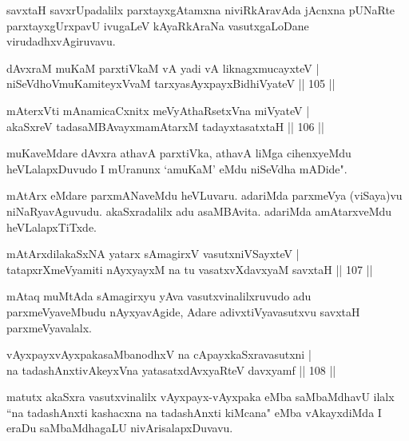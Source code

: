\begin{artha}
savxtaH savxrUpadalilx parxtayxgAtamxna niviRkAravAda jAcnxna pUNaRte parxtayxgUrxpavU ivugaLeV kAyaRkAraNa vasutxgaLoDane virudadhxvAgiruvavu.
\end{artha}

\begin{shl}
dAvxraM muKaM parxtiVkaM vA yadi vA liknagxmucayxteV |\\
niSeVdhoV\s muKamiteyxVvaM tarxyasAyxpayxBidhiVyateV \hfill || 105 ||
\end{shl}

\begin{shl}
mAterxVti mAnamicaCxnitx meVyA\s thaRsetxVna miVyateV |\\
akaSxreV tadasaMBAvayxmamAtarxM tadayxtasatxtaH \hfill || 106 ||
\end{shl}

\begin{artha}
muKaveMdare dAvxra athavA parxtiVka, athavA liMga cihenxyeMdu heVLalapxDuvudo I mUranunx `amuKaM' eMdu niSeVdha mADide".
\end{artha}

\begin{artha}%
mAtArx eMdare parxmANaveMdu heVLuvaru. adariMda parxmeVya (viSaya)vu niNaRyavAguvudu. akaSxradalilx adu asaMBAvita. adariMda amAtarxveMdu heVLalapxTiTxde. 
\end{artha}

\begin{shl}
mAtArxdilakaSxNA yatarx sAmagirxV vasutxniVSayxteV |\\
tatapxrXmeVyamiti nAyxyayxM na tu vasatxvXdavxyaM savxtaH \hfill || 107 ||
\end{shl}

\begin{artha}
mAtaq muMtAda sAmagirxyu yAva vasutxvinalilxruvudo adu parxmeVya\-veMbudu nAyxyavAgide, Adare adivxtiVyavasutxvu savxtaH parxmeVyavalalx.
\end{artha}

\begin{shl}
vAyxpayxvAyxpakasaMbanodhxV na cApayxkaSxravasutxni |\\
na tadashAnxtivAkeyxVna yatasatxdAvxyaRteV davxyamf \hfill || 108 ||
\end{shl}

\begin{artha}
matutx akaSxra vasutxvinalilx vAyxpayx-vAyxpaka eMba saMbaMdhavU ilalx ``na tadashAnxti kashacxna na tadashAnxti kiMcana" eMba vAkayxdiMda I eraDu saMbaMdhagaLU nivArisalapxDuvavu.
\end{artha}

